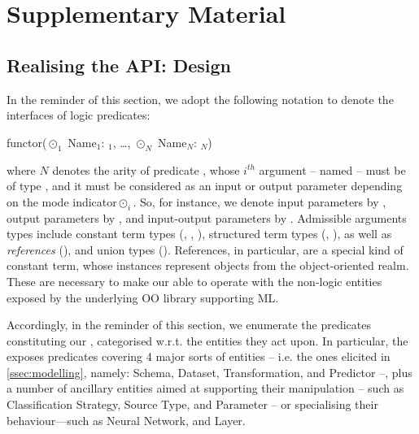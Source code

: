 \documentclass[runningheads]{llncs}
\begin{document}



\newpage

\appendix

\section{Supplementary Material}

\subsection{Realising the API: \mllib{} Design}
\label{sec:project}

%
In the reminder of this section, we adopt the following notation to denote the interfaces of logic predicates:
%
\begin{lp}
    functor($\odot_1$ Name$_1$: $_1$, \ldots, $\odot_N$ Name$_N$: $_N$)
\end{lp}
%
where $N$ denotes the arity of predicate , whose $i^{th}$ argument -- named  -- must be of type , and it must be considered as an input or output parameter depending on the mode indicator\footnotemark $\odot_i$.
%
%
So, for instance, we denote input parameters by \pl{+}, output parameters by \pl{-}, and input-output parameters by .
%
Admissible arguments types include constant term types (, , ), structured term types (, ), as well as \emph{references} (), and union types ().
%
References, in particular, are a special kind of constant term, whose instances represent objects from the object-oriented realm.
%
These are necessary to make our \mllib{} able to operate with the non-logic entities exposed by the underlying OO library supporting ML.

Accordingly, in the reminder of this section, we enumerate the predicates constituting our \mllib{}, categorised w.r.t. the entities they act upon.
%
In particular, the \mllib{} exposes predicates covering 4 major sorts of entities -- i.e. the ones elicited in \cref{ssec:modelling}, namely: Schema, Dataset, Transformation, and Predictor --, plus a number of ancillary entities aimed at supporting their manipulation -- such as Classification Strategy, Source Type, and Parameter -- or specialising their behaviour---such as Neural Network, and Layer.
\end{document}

